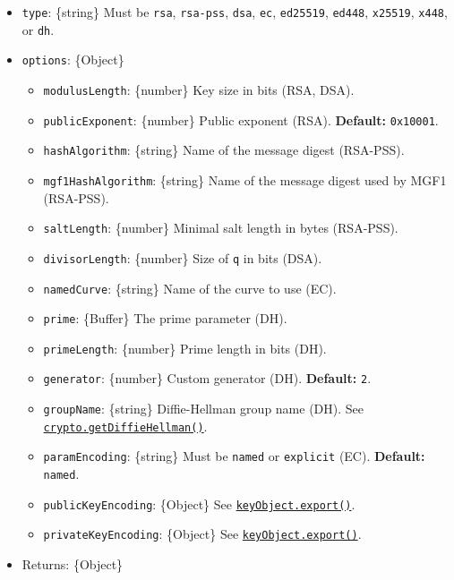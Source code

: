 \begin{itemize}
\tightlist
\item
  \texttt{type}: \{string\} Must be
  \texttt{\textquotesingle{}rsa\textquotesingle{}},
  \texttt{\textquotesingle{}rsa-pss\textquotesingle{}},
  \texttt{\textquotesingle{}dsa\textquotesingle{}},
  \texttt{\textquotesingle{}ec\textquotesingle{}},
  \texttt{\textquotesingle{}ed25519\textquotesingle{}},
  \texttt{\textquotesingle{}ed448\textquotesingle{}},
  \texttt{\textquotesingle{}x25519\textquotesingle{}},
  \texttt{\textquotesingle{}x448\textquotesingle{}}, or
  \texttt{\textquotesingle{}dh\textquotesingle{}}.
\item
  \texttt{options}: \{Object\}

  \begin{itemize}
  \tightlist
  \item
    \texttt{modulusLength}: \{number\} Key size in bits (RSA, DSA).
  \item
    \texttt{publicExponent}: \{number\} Public exponent (RSA).
    \textbf{Default:} \texttt{0x10001}.
  \item
    \texttt{hashAlgorithm}: \{string\} Name of the message digest
    (RSA-PSS).
  \item
    \texttt{mgf1HashAlgorithm}: \{string\} Name of the message digest
    used by MGF1 (RSA-PSS).
  \item
    \texttt{saltLength}: \{number\} Minimal salt length in bytes
    (RSA-PSS).
  \item
    \texttt{divisorLength}: \{number\} Size of \texttt{q} in bits (DSA).
  \item
    \texttt{namedCurve}: \{string\} Name of the curve to use (EC).
  \item
    \texttt{prime}: \{Buffer\} The prime parameter (DH).
  \item
    \texttt{primeLength}: \{number\} Prime length in bits (DH).
  \item
    \texttt{generator}: \{number\} Custom generator (DH).
    \textbf{Default:} \texttt{2}.
  \item
    \texttt{groupName}: \{string\} Diffie-Hellman group name (DH). See
    \hyperref[cryptogetdiffiehellmangroupname]{\texttt{crypto.getDiffieHellman()}}.
  \item
    \texttt{paramEncoding}: \{string\} Must be
    \texttt{\textquotesingle{}named\textquotesingle{}} or
    \texttt{\textquotesingle{}explicit\textquotesingle{}} (EC).
    \textbf{Default:}
    \texttt{\textquotesingle{}named\textquotesingle{}}.
  \item
    \texttt{publicKeyEncoding}: \{Object\} See
    \hyperref[keyobjectexportoptions]{\texttt{keyObject.export()}}.
  \item
    \texttt{privateKeyEncoding}: \{Object\} See
    \hyperref[keyobjectexportoptions]{\texttt{keyObject.export()}}.
  \end{itemize}
\item
  Returns: \{Object\}


\end{itemize}
